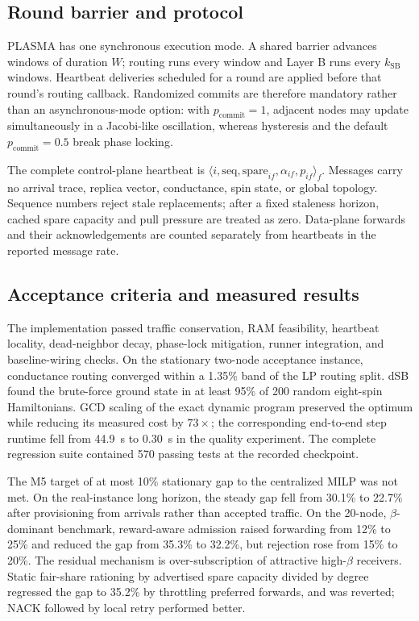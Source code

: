 \subsection{Round barrier and protocol}
PLASMA has one synchronous execution mode.  A shared barrier advances windows
of duration $W$; routing runs every window and Layer B runs every $k_{\mathrm{SB}}$
windows.  Heartbeat deliveries scheduled for a round are applied before that
round's routing callback.  Randomized commits are therefore mandatory rather
than an asynchronous-mode option: with $p_{\mathrm{commit}}=1$, adjacent nodes
may update simultaneously in a Jacobi-like oscillation, whereas hysteresis and
the default $p_{\mathrm{commit}}=0.5$ break phase locking.

The complete control-plane heartbeat is
$\langle i,\mathrm{seq},\mathrm{spare}_{if},\alpha_{if},p_{if}\rangle_f$.
Messages carry no arrival trace, replica vector, conductance, spin state, or
global topology.  Sequence numbers reject stale replacements; after a fixed
staleness horizon, cached spare capacity and pull pressure are treated as
zero.  Data-plane forwards and their acknowledgements are counted separately
from heartbeats in the reported message rate.

\subsection{Acceptance criteria and measured results}
The implementation passed traffic conservation, RAM feasibility, heartbeat
locality, dead-neighbor decay, phase-lock mitigation, runner integration, and
baseline-wiring checks.  On the stationary two-node acceptance instance,
conductance routing converged within a 1.35\% band of the LP routing split.
dSB found the brute-force ground state in at least 95\% of 200 random
eight-spin Hamiltonians.  GCD scaling of the exact dynamic program preserved
the optimum while reducing its measured cost by $73\times$; the corresponding
end-to-end step runtime fell from 44.9~s to 0.30~s in the quality experiment.
The complete regression suite contained 570 passing tests at the recorded
checkpoint.

The M5 target of at most 10\% stationary gap to the centralized MILP was not
met.  On the real-instance long horizon, the steady gap fell from 30.1\% to
22.7\% after provisioning from arrivals rather than accepted traffic.  On the
20-node, $\beta$-dominant benchmark, reward-aware admission raised forwarding
from 12\% to 25\% and reduced the gap from 35.3\% to 32.2\%, but rejection rose
from 15\% to 20\%.  The residual mechanism is over-subscription of attractive
high-$\beta$ receivers.  Static fair-share rationing by advertised spare
capacity divided by degree regressed the gap to 35.2\% by throttling preferred
forwards, and was reverted; NACK followed by local retry performed better.

